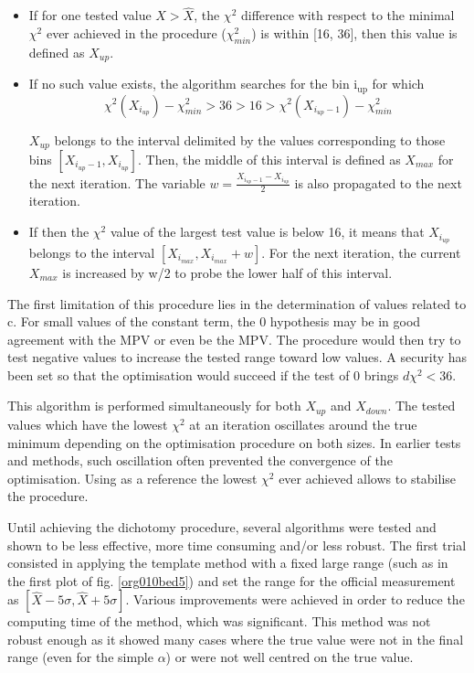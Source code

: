 \begin{itemize}
\item If for one tested value $X>\hat{X}$, the $\chi^2$ difference with respect to the minimal $\chi^2$ ever achieved in the procedure ($\chi^2_{min}$) is within [16, 36], then this value is defined as $X_{up}$.

\item If no such value exists, the algorithm searches for the bin i\(_{\text{up}}\) for which
\begin{equation}
\chi^{2}(X_{i_{up}})-\chi^2_{min}>36>16>\chi^2(X_{i_{up}-1})-\chi^2_{min}
\end{equation}

$X_{up}$ belongs to the interval delimited by the values corresponding to those bins \([X_{i_{up}-1}, X_{i_{up}}]\).
Then, the middle of this interval is defined as $X_{max}$ for the next iteration.
The variable $w=\frac{X_{i_{up}-1}-X_{i_{up}}}{2}$ is also propagated to the next iteration.

\item If then the $\chi^2$ value of the largest test value is below 16, it means that $X_{i_{up}}$ belongs to the interval $[X_{i_{max}}, X_{i_{max}}+w]$.
For the next iteration, the current $X_{max}$ is increased by w/2 to probe the lower half of this interval.
\end{itemize}


The first limitation of this procedure lies in the determination of values related to c.
For small values of the constant term, the 0 hypothesis may be in good agreement with the MPV or even be the MPV.
The procedure would then try to test negative values to increase the tested range toward low values.
A security has been set so that the optimisation would succeed if the test of 0 brings $d\chi^2<36$.

This algorithm is performed simultaneously for both $X_{up}$ and $X_{down}$.
The tested values which have the lowest $\chi^2$ at an iteration oscillates around the true minimum depending on the optimisation procedure on both sizes.
In earlier tests and methods, such oscillation often prevented the convergence of the optimisation.
Using as a reference the lowest $\chi^2$ ever achieved allows to stabilise the procedure.

Until achieving the dichotomy procedure, several algorithms were tested and shown to be less effective, more time consuming and/or less robust.
The first trial consisted in applying the template method with a fixed large range (such as in the first plot of fig. \ref{org010bed5}) and set the range for the official measurement as \([\hat{X}- 5\sigma, \hat{X}+ 5\sigma]\).
Various improvements were achieved in order to reduce the computing time of the method, which was significant.
This method was not robust enough as it showed many cases where the true value were not in the final range (even for the simple $\alpha$) or were not well centred on the true value.

